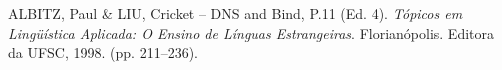 \begin{thebibliography}{1}
ALBITZ, Paul \& LIU, Cricket -- DNS
  and Bind, P.11 (Ed. 4).
\emph{Tópicos em Lingüística Aplicada: O Ensino de Línguas
Estrangeiras}. Florianópolis. Editora da UFSC, 1998. (pp. 211--236).



\end{thebibliography}

